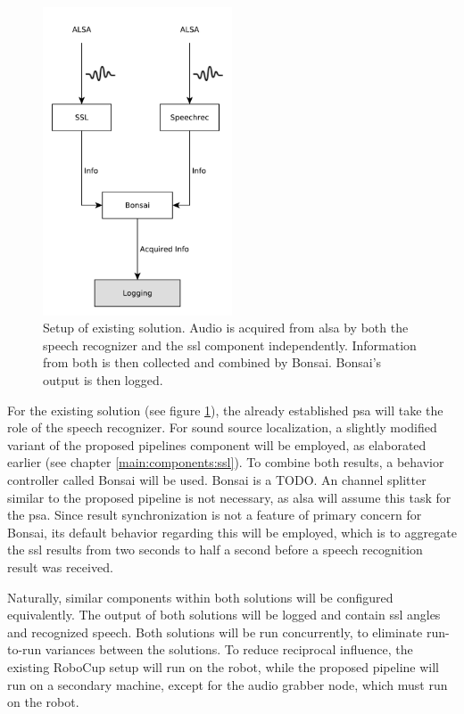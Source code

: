\begin{figure}[]
	\centering
	\includegraphics[width=0.5\textwidth]{diagrams/eval_task_old.pdf}
	\caption{Setup of existing solution. 
		Audio is acquired from \gls{alsa} by both the speech recognizer and the \gls{ssl} component independently. 
		Information from both is then collected and combined by Bonsai.
		Bonsai's output is then logged.}
	\label{pic:eval_task_setup_old}
\end{figure}

For the existing solution (see figure \ref{pic:eval_task_setup_old}), the already established \gls{psa} will take the role of the speech recognizer.
For sound source localization, a slightly modified variant of the proposed pipelines component will be employed, as elaborated earlier (see chapter \ref{main:components:ssl}).
To combine both results, a behavior controller called Bonsai \cite{bonsai} will be used.
Bonsai is a TODO.
An channel splitter similar to the proposed pipeline is not necessary, as \gls{alsa} will assume this task for the \gls{psa}.
Since result synchronization is not a feature of primary concern for Bonsai, its default behavior regarding this will be employed, which is to aggregate the \gls{ssl} results from two seconds to half a second before a speech recognition result was received.

Naturally, similar components within both solutions will be configured equivalently.
The output of both solutions will be logged and contain \gls{ssl} angles and recognized speech.
Both solutions will be run concurrently, to eliminate run-to-run variances between the solutions.
To reduce reciprocal influence, the existing RoboCup setup will run on the robot, while the proposed pipeline will run on a secondary machine, except for the audio grabber node, which must run on the robot.

